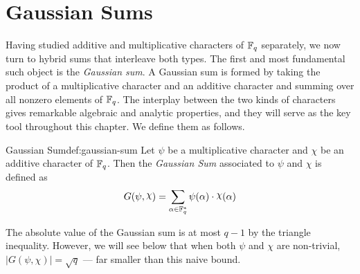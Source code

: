 \section{Gaussian Sums}\label{sec:gaussian-sums}
Having studied additive and multiplicative characters of $\mathbb{F}_q$ separately, we now turn to hybrid sums that interleave both types. The first and most fundamental such object is the \emph{Gaussian sum}. A Gaussian sum is formed by taking the product of a multiplicative character and an additive character and summing over all nonzero elements of $\mathbb{F}_q$. The interplay between the two kinds of characters gives remarkable algebraic and analytic properties, and they will serve as the key tool throughout this chapter. We define them as follows.
\begin{Definition}{Gaussian Sum}{def:gaussian-sum}
  Let $\psi $ be a multiplicative character and $\chi$ be an additive character of $\mathbb{F}_q$. Then the \emph{Gaussian Sum} associated to $\psi$ and $\chi$ is defined as $$G(\psi,\chi)=\sum_{\alpha\in\bbF_q^*}\psi(\alpha)\cdot \chi(\alpha)$$
\end{Definition}

The absolute value of the Gaussian sum is at most $q-1$ by the triangle inequality. However, we will see below that when both $\psi$ and $\chi$ are non-trivial, $|G(\psi,\chi)|=\sqrt{q}$ --- far smaller than this naive bound.

